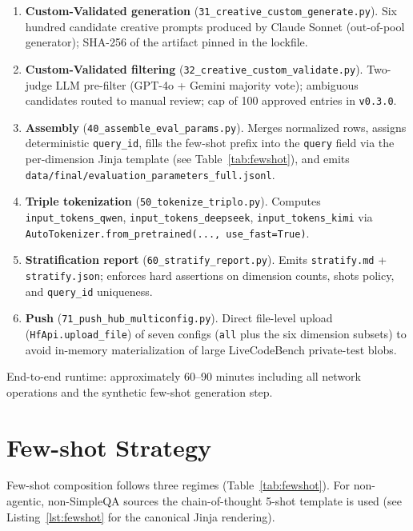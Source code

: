 \documentclass[11pt,a4paper]{article}
\begin{document}
\begin{enumerate}[leftmargin=*,itemsep=2pt]
  \item \textbf{Custom-Validated generation} (\texttt{31\_creative\_custom\_generate.py}). Six hundred candidate creative prompts produced by Claude Sonnet (out-of-pool generator); SHA-256 of the artifact pinned in the lockfile.
  \item \textbf{Custom-Validated filtering} (\texttt{32\_creative\_custom\_validate.py}). Two-judge LLM pre-filter (GPT-4o + Gemini majority vote); ambiguous candidates routed to manual review; cap of 100 approved entries in \texttt{v0.3.0}.
  \item \textbf{Assembly} (\texttt{40\_assemble\_eval\_params.py}). Merges normalized rows, assigns deterministic \texttt{query\_id}, fills the few-shot prefix into the \texttt{query} field via the per-dimension Jinja template (see Table~\ref{tab:fewshot}), and emits \texttt{data/final/evaluation\_parameters\_full.jsonl}.
  \item \textbf{Triple tokenization} (\texttt{50\_tokenize\_triplo.py}). Computes \texttt{input\_tokens\_qwen}, \texttt{input\_tokens\_deepseek}, \texttt{input\_tokens\_kimi} via \texttt{AutoTokenizer.from\_pretrained(..., use\_fast=True)}.
  \item \textbf{Stratification report} (\texttt{60\_stratify\_report.py}). Emits \texttt{stratify.md} + \texttt{stratify.json}; enforces hard assertions on dimension counts, shots policy, and \texttt{query\_id} uniqueness.
  \item \textbf{Push} (\texttt{71\_push\_hub\_multiconfig.py}). Direct file-level upload (\texttt{HfApi.upload\_file}) of seven configs (\texttt{all} plus the six dimension subsets) to avoid in-memory materialization of large LiveCodeBench private-test blobs.
\end{enumerate}

End-to-end runtime: approximately 60--90 minutes including all network operations and the synthetic few-shot generation step.

\section{Few-shot Strategy}\label{sec:fewshot}

Few-shot composition follows three regimes (Table~\ref{tab:fewshot}). For non-agentic, non-SimpleQA sources the chain-of-thought 5-shot template is used (see Listing~\ref{lst:fewshot} for the canonical Jinja rendering).
\end{document}
